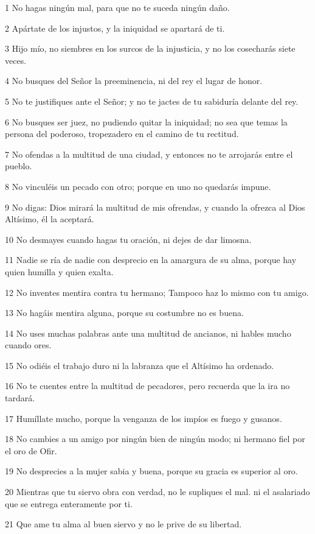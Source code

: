 \par 1 No hagas ningún mal, para que no te suceda ningún daño.
\par 2 Apártate de los injustos, y la iniquidad se apartará de ti.
\par 3 Hijo mío, no siembres en los surcos de la injusticia, y no los cosecharás siete veces.
\par 4 No busques del Señor la preeminencia, ni del rey el lugar de honor.
\par 5 No te justifiques ante el Señor; y no te jactes de tu sabiduría delante del rey.
\par 6 No busques ser juez, no pudiendo quitar la iniquidad; no sea que temas la persona del poderoso, tropezadero en el camino de tu rectitud.
\par 7 No ofendas a la multitud de una ciudad, y entonces no te arrojarás entre el pueblo.
\par 8 No vinculéis un pecado con otro; porque en uno no quedarás impune.
\par 9 No digas: Dios mirará la multitud de mis ofrendas, y cuando la ofrezca al Dios Altísimo, él la aceptará.
\par 10 No desmayes cuando hagas tu oración, ni dejes de dar limosna.
\par 11 Nadie se ría de nadie con desprecio en la amargura de su alma, porque hay quien humilla y quien exalta.
\par 12 No inventes mentira contra tu hermano; Tampoco haz lo mismo con tu amigo.
\par 13 No hagáis mentira alguna, porque su costumbre no es buena.
\par 14 No uses muchas palabras ante una multitud de ancianos, ni hables mucho cuando ores.
\par 15 No odiéis el trabajo duro ni la labranza que el Altísimo ha ordenado.
\par 16 No te cuentes entre la multitud de pecadores, pero recuerda que la ira no tardará.
\par 17 Humíllate mucho, porque la venganza de los impíos es fuego y gusanos.
\par 18 No cambies a un amigo por ningún bien de ningún modo; ni hermano fiel por el oro de Ofir.
\par 19 No desprecies a la mujer sabia y buena, porque su gracia es superior al oro.
\par 20 Mientras que tu siervo obra con verdad, no le supliques el mal. ni el asalariado que se entrega enteramente por ti.
\par 21 Que ame tu alma al buen siervo y no le prive de su libertad.
